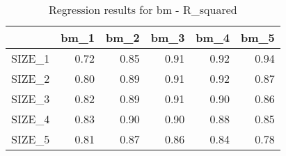 \begin{table}[ht]
\centering
\caption{Regression results for bm - R_squared} 
\begin{tabular}{rrrrrr}
  \hline
 & bm\_1 & bm\_2 & bm\_3 & bm\_4 & bm\_5 \\ 
  \hline
SIZE\_1 & 0.72 & 0.85 & 0.91 & 0.92 & 0.94 \\ 
  SIZE\_2 & 0.80 & 0.89 & 0.91 & 0.92 & 0.87 \\ 
  SIZE\_3 & 0.82 & 0.89 & 0.91 & 0.90 & 0.86 \\ 
  SIZE\_4 & 0.83 & 0.90 & 0.90 & 0.88 & 0.85 \\ 
  SIZE\_5 & 0.81 & 0.87 & 0.86 & 0.84 & 0.78 \\ 
   \hline
\end{tabular}
\end{table}


